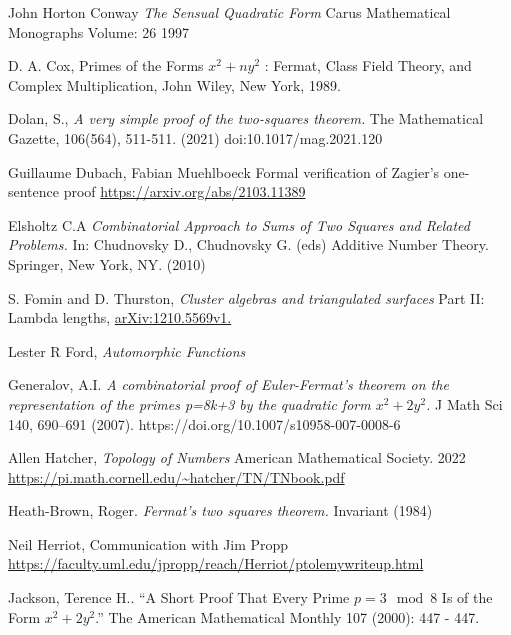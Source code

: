 \documentclass[12pt,a4paper]{amsart}
\begin{document}
John Horton Conway
\textit{The Sensual Quadratic Form}
Carus Mathematical Monographs
Volume: 26
1997

 D. A. Cox, Primes of the Forms $x^2 + ny^2$
: Fermat, Class Field Theory, and
Complex Multiplication, John Wiley, New York, 1989.

Dolan, S., 
\textit{A very simple proof of the two-squares theorem.}
The Mathematical Gazette, 106(564), 511-511. (2021) doi:10.1017/mag.2021.120

Guillaume Dubach, Fabian Muehlboeck
Formal verification of Zagier's one-sentence proof
\url{https://arxiv.org/abs/2103.11389}

Elsholtz C.A 
\textit{Combinatorial Approach to Sums of Two Squares and Related Problems.}
 In: Chudnovsky D., Chudnovsky G. (eds) Additive Number Theory. Springer, New York, NY.
 (2010) 

S. Fomin and D. Thurston,
\textit{Cluster algebras and triangulated surfaces}
Part II: Lambda lengths, \url{arXiv:1210.5569v1.}

Lester R Ford,
\textit{Automorphic Functions}

Generalov, A.I. 
\textit{A combinatorial proof of Euler-Fermat’s theorem on the representation of the primes p=8k+3 by the quadratic
form $x^2 + 2y^2$. }
J Math Sci 140, 690–691 (2007). https://doi.org/10.1007/s10958-007-0008-6


Allen Hatcher, 
\textit{Topology of Numbers} 
American Mathematical Society.
2022
\url{https://pi.math.cornell.edu/~hatcher/TN/TNbook.pdf}


Heath-Brown, Roger. 
\textit{ Fermat’s two squares theorem.} Invariant (1984) 

Neil Herriot, Communication with Jim Propp
\url{https://faculty.uml.edu/jpropp/reach/Herriot/ptolemywriteup.html}

Jackson, Terence H.. “A Short Proof That Every Prime $p = 3 \mod 8$ Is of the Form $x^2 + 2y^2$.” The American Mathematical Monthly 107 (2000): 447 - 447.
\end{document}
